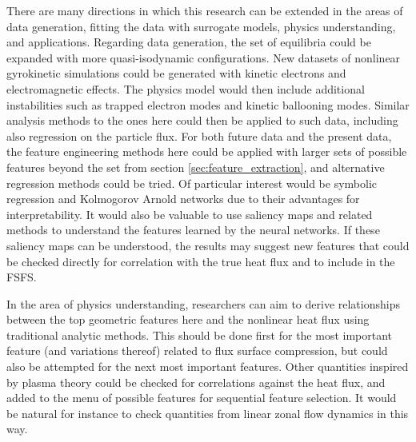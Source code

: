 \documentclass{jpp}
\begin{document}
There are many directions in which this research can be extended in the areas of data generation, fitting the data with surrogate models, physics understanding, and applications.
Regarding data generation, the set of equilibria could be expanded with more quasi-isodynamic configurations.
New datasets of nonlinear gyrokinetic simulations could be generated with kinetic electrons and electromagnetic effects.
The physics model would then include additional instabilities such as trapped electron modes and kinetic ballooning modes.
Similar analysis methods to the ones here could then be applied to such data, including also regression on the particle flux.
For both future data and the present data, the feature engineering methods here could be applied with larger sets of possible features beyond the set from section \ref{sec:feature_extraction}, and alternative regression methods could be tried.
Of particular interest would be symbolic regression and Kolmogorov Arnold networks \citep{liu2024kan} due to their advantages for interpretability.
It would also be valuable to use saliency maps and related methods to understand the features learned by the neural networks.
If these saliency maps can be understood, the results may suggest new features that could be checked directly for correlation with the true heat flux and to include in the FSFS.

In the area of physics understanding, researchers can aim to  derive relationships between the top geometric features here and the nonlinear heat flux using traditional analytic methods.
This should be done first for the most important feature (and variations thereof) related to flux surface compression, but could also be attempted for the next most important features.
Other quantities inspired by plasma theory could be checked for correlations against the heat flux, and added to the menu of possible features for sequential feature selection.
It would be natural for instance to check quantities from linear zonal flow dynamics in this way.
\end{document}

